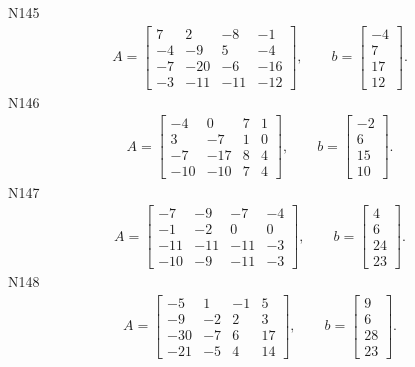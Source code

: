 \documentclass[11pt]{report}
\begin{document}
N145
\begin{align*}
 A = \left[\begin{matrix}7 & 2 & -8 & -1\\-4 & -9 & 5 & -4\\-7 & -20 & -6 & -16\\-3 & -11 & -11 & -12\end{matrix}\right],
\qquad b = \left[\begin{matrix}-4\\7\\17\\12\end{matrix}\right]. 
 \end{align*}
N146
\begin{align*}
 A = \left[\begin{matrix}-4 & 0 & 7 & 1\\3 & -7 & 1 & 0\\-7 & -17 & 8 & 4\\-10 & -10 & 7 & 4\end{matrix}\right],
\qquad b = \left[\begin{matrix}-2\\6\\15\\10\end{matrix}\right]. 
 \end{align*}
N147
\begin{align*}
 A = \left[\begin{matrix}-7 & -9 & -7 & -4\\-1 & -2 & 0 & 0\\-11 & -11 & -11 & -3\\-10 & -9 & -11 & -3\end{matrix}\right],
\qquad b = \left[\begin{matrix}4\\6\\24\\23\end{matrix}\right]. 
 \end{align*}
N148
\begin{align*}
 A = \left[\begin{matrix}-5 & 1 & -1 & 5\\-9 & -2 & 2 & 3\\-30 & -7 & 6 & 17\\-21 & -5 & 4 & 14\end{matrix}\right],
\qquad b = \left[\begin{matrix}9\\6\\28\\23\end{matrix}\right]. 
 \end{align*}
\end{document}
